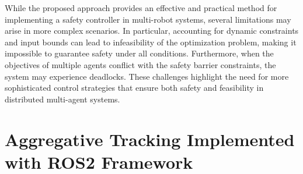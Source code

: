 \medskip
While the proposed approach provides an effective and practical method for implementing a safety controller in multi-robot systems, several limitations may arise in more complex scenarios. In particular, accounting for dynamic constraints and input bounds can lead to infeasibility of the optimization problem, making it impossible to guarantee safety under all conditions. Furthermore, when the objectives of multiple agents conflict with the safety barrier constraints, the system may experience deadlocks. These challenges highlight the need for more sophisticated control strategies that ensure both safety and feasibility in distributed multi-agent systems.

\newpage

\section{Aggregative Tracking Implemented with ROS2 Framework}

